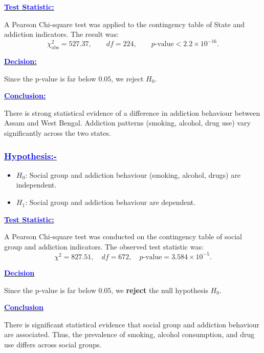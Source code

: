 \underline{\textbf{\textcolor{blue}{Test Statistic:}}}

A Pearson Chi-square test was applied to the contingency table of
State and addiction indicators. The result was:
\[
\chi^2_{\text{obs}} = 527.37,\qquad df = 224,\qquad p\text{-value} < 2.2\times 10^{-16}.
\]

\underline{\textbf{\textcolor{blue}{Decision: }}}

Since the p-value is far below $0.05$, we reject $H_0$.

\underline{\textbf{\textcolor{blue}{Conclusion: }}}

There is strong statistical evidence of a difference in addiction behaviour between Assam and West Bengal. Addiction patterns (smoking, alcohol, drug use) vary significantly across the two states.

\subsubsection{\underline{\textbf{\textcolor{blue}{Hypothesis:-}}}}
\begin{itemize}
    \item $H_0$: Social group and addiction behaviour (smoking, alcohol, drugs) are independent.
    \item $H_1$: Social group and addiction behaviour are dependent.
\end{itemize}

\underline{\textbf{\textcolor{blue}{Test Statistic:}}}

A Pearson Chi-square test was conducted on the contingency table of social group and addiction indicators. The observed test statistic was:
\[
\chi^2 = 827.51, \quad df = 672, \quad p\text{-value} = 3.584 \times 10^{-5}.
\]

\underline{\textbf{\textcolor{blue}{Decision }}}


Since the p-value is far below $0.05$, we \textcolor{deepgreen}{\textbf{reject}} the null hypothesis $H_0$.

\underline{\textbf{\textcolor{blue}{Conclusion }}}

There is significant statistical evidence that social group and addiction behaviour are associated.  
Thus, the prevalence of smoking, alcohol consumption, and drug use differs across social groups.


